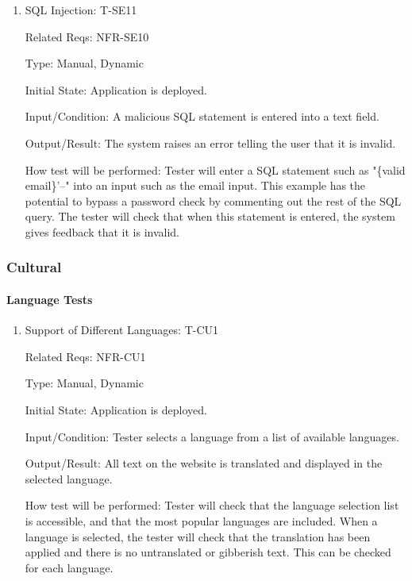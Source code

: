 \documentclass[12pt, titlepage]{article}
\begin{document}
\begin{enumerate}

\item{SQL Injection: T-SE11\\}

Related Reqs: NFR-SE10

Type: Manual, Dynamic
					
Initial State: Application is deployed.
					
Input/Condition: A malicious SQL statement is entered into a text field.
					
Output/Result: The system raises an error telling the user that it is invalid.
					
How test will be performed: Tester will enter a SQL statement such as "\{valid email\}'--" into an input such as the email input. This example has the potential to bypass a password check by commenting out the rest of the SQL query. The tester will check that when this statement is entered, the system gives feedback that it is invalid.

\end{enumerate}

\subsubsection{Cultural}
		
\paragraph{Language Tests}

\begin{enumerate}

\item{Support of Different Languages: T-CU1\\}

Related Reqs: NFR-CU1

Type: Manual, Dynamic
					
Initial State: Application is deployed.
					
Input/Condition: Tester selects a language from a list of available languages.
					
Output/Result: All text on the website is translated and displayed in the selected language.
					
How test will be performed: Tester will check that the language selection list is accessible, and that the most popular languages are included. When a language is selected, the tester will check that the translation has been applied and there is no untranslated or gibberish text. This can be checked for each language.
\end{enumerate}
\end{document}
